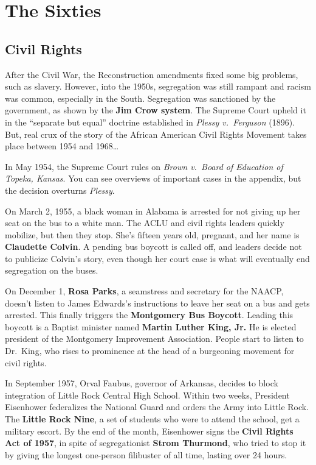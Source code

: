 \section{The Sixties}

\subsection*{Civil Rights}

After the Civil War, the Reconstruction amendments fixed some big problems, such as slavery.
However, into the 1950s, segregation was still rampant and racism was common, especially in the South.
Segregation was sanctioned by the government, as shown by the \textbf{Jim Crow system}.
The Supreme Court upheld it in the ``separate but equal'' doctrine
established in \textit{Plessy v.\ Ferguson} (1896).
But, real crux of the story of the African American Civil Rights Movement takes place between 1954 and 1968\ldots{}

In May 1954, the Supreme Court rules on \textit{Brown v.\ Board of Education of Topeka, Kansas}.
You can see overviews of important cases in the appendix, but the decision overturns \textit{Plessy}.

On March 2, 1955, a black woman in Alabama is arrested for not giving up her seat on the bus to a white man.
The ACLU and civil rights leaders quickly mobilize, but then they stop.
She's fifteen years old, pregnant, and her name is \textbf{Claudette Colvin}.
A pending bus boycott is called off, and leaders decide not to publicize Colvin's story,
even though her court case is what will eventually end segregation on the buses.

On December 1, \textbf{Rosa Parks}, a seamstress and secretary for the NAACP,
doesn't listen to James Edwards's instructions to leave her seat on a bus and gets arrested.
This finally triggers the \textbf{Montgomery Bus Boycott}.
Leading this boycott is a Baptist minister named \textbf{Martin Luther King, Jr.}
He is elected president of the Montgomery Improvement Association.
People start to listen to Dr.\ King, who rises to prominence at the head of a burgeoning movement for civil rights.

In September 1957, Orval Faubus, governor of Arkansas,
decides to block integration of Little Rock Central High School.
Within two weeks, President Eisenhower federalizes the National Guard and orders the Army into Little Rock.
The \textbf{Little Rock Nine}, a set of students who were to attend the school, get a military escort.
By the end of the month, Eisenhower signs the \textbf{Civil Rights Act of 1957},
in spite of segregationist \textbf{Strom Thurmond},
who tried to stop it by giving the longest one-person filibuster of all time, lasting over 24 hours.

